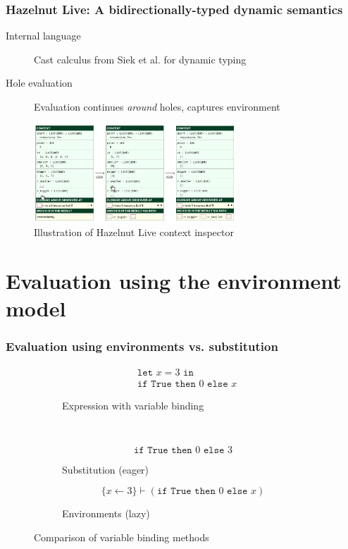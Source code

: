 \documentclass{beamer}
\begin{document}
\begin{frame}
  \frametitle{Hazelnut Live: A bidirectionally-typed dynamic semantics}

  \begin{description}
  \item[Internal language] Cast calculus from Siek et al. \cite{Siek06gradualtyping,siek2015refined} for dynamic typing
  \item[Hole evaluation] Evaluation continues \textit{around} holes, captures environment
  \end{description}
  
  \begin{figure}
    \centering
    \includegraphics[height=10em]{thesis/img/hazelnut_live_context_inspector}
    \caption{Illustration of Hazelnut Live context inspector \cite{conf/popl/HazelnutLive19}}
    \label{fig:hazelnut-live-context-inspector}
  \end{figure}
\end{frame}

\section{Evaluation using the environment model}

\begin{frame}
  \frametitle{Evaluation using environments vs. substitution}

  \begin{figure}
    \centering
    \begin{subfigure}[b]{0.45\textwidth}
      \begin{align*}
        & \texttt{let }x=3\texttt{ in}\\
        & \texttt{if True then }0\texttt{ else }x
      \end{align*}
      \caption{Expression with variable binding}
    \end{subfigure} \\
    \begin{subfigure}[b]{0.35\textwidth}
      \begin{equation*}
        \texttt{if True then }0\texttt{ else }3
      \end{equation*}
      \caption{Substitution (eager)}
    \end{subfigure}
    \qquad
    \begin{subfigure}[b]{0.55\textwidth}
      \begin{equation*}
        \{x\leftarrow 3\}\vdash(\texttt{if True then }0\texttt{ else }x)
      \end{equation*}
      \caption{Environments (lazy)}
    \end{subfigure}
    \caption{Comparison of variable binding methods}
  \end{figure}
\end{frame}
\end{document}
